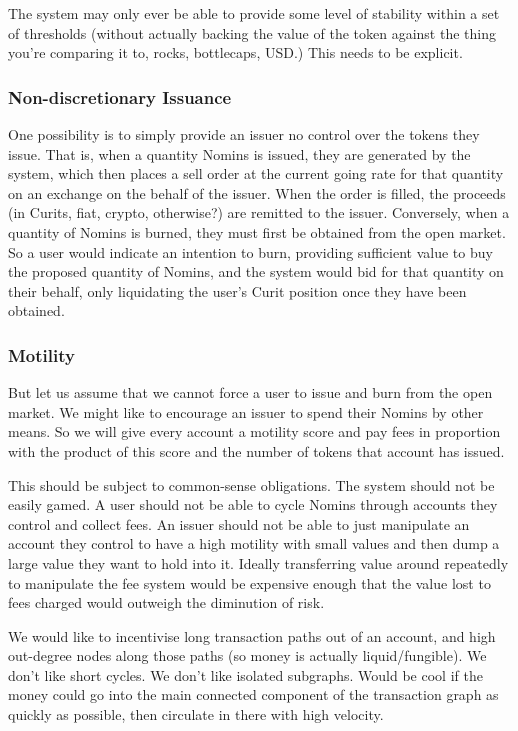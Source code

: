 \documentclass{article}
\begin{document}
The system may only ever be able to provide some level of stability within a set of thresholds (without actually backing the value of the token against the thing you're comparing it to, rocks, bottlecaps, USD.) This needs to be explicit.


\subsubsection{Non-discretionary Issuance}

One possibility is to simply provide an issuer no control over the tokens they issue. That is, when a quantity Nomins is issued, they are generated by the system, which then places a sell order at the current going rate for that quantity on an exchange on the behalf of the issuer. When the order is filled, the proceeds (in Curits, fiat, crypto, otherwise?) are remitted to the issuer.
Conversely, when a quantity of Nomins is burned, they must first be obtained from the open market. So a user would indicate an intention to burn, providing sufficient value to buy the proposed quantity of Nomins, and the system would bid for that quantity on their behalf, only liquidating the user's Curit position once they have been obtained.

\subsubsection{Motility}

But let us assume that we cannot force a user to issue and burn from the open market. We might like to encourage an issuer to spend their Nomins by other means. So we will give every account a motility score and pay fees in proportion with the product of this score and the number of tokens that account has issued.

This should be subject to common-sense obligations. The system should not be easily gamed. A user should not be able to cycle Nomins through accounts they control and collect fees. An issuer should not be able to just manipulate an account they control to have a high motility with small values and then dump a large value they want to hold into it. Ideally transferring value around repeatedly to manipulate the fee system would be expensive enough that the value lost to fees charged would outweigh the diminution of risk.

We would like to incentivise long transaction paths out of an account, and high out-degree nodes along those paths (so money is actually liquid/fungible).
We don't like short cycles. We don't like isolated subgraphs. Would be cool if the money could go into the main connected component of the transaction graph as quickly as possible, then circulate in there with high velocity.
\end{document}
